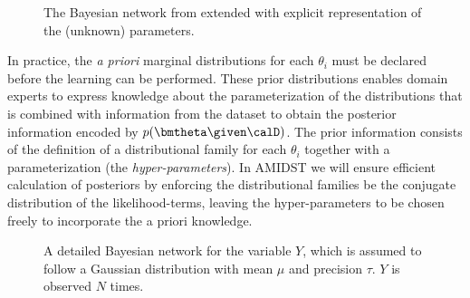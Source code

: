 \begin{figure}[htb]
  \begin{center}
  \end{center}
  \caption{The Bayesian network from  extended with explicit representation of the (unknown) parameters.}
  \label{fig:bayesLearn}
\end{figure}


In practice, the \textit{a priori} marginal distributions for each $\theta_i$ must be declared before the learning can be performed. These prior distributions enables domain experts to express knowledge about the parameterization of the distributions that is combined with information from the dataset to obtain the posterior information encoded by $p(\bmtheta\given\calD)$. The prior information consists of the definition of a distributional family for each $\theta_i$ together with a parameterization (the \textit{hyper-parameters}). In AMIDST we will ensure efficient calculation of posteriors by enforcing the distributional families be the conjugate distribution of the likelihood-terms, leaving the hyper-parameters to be chosen freely to incorporate the a priori knowledge. 






\begin{figure}[htb]
  \begin{center}
  \end{center}
  \caption{A detailed Bayesian network for the variable $Y$, which is assumed to follow a Gaussian distribution with mean $\mu$ and precision $\tau$. $Y$ is observed $N$ times.}
  \label{fig:bayesLearnDetail}
\end{figure}



